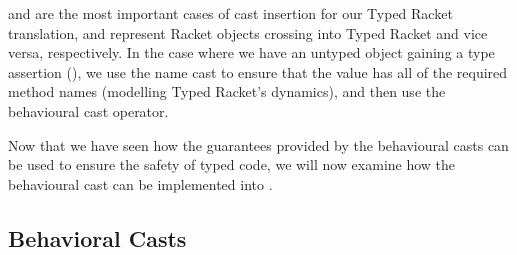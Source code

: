 \documentclass[a4paper,USenglish]{tex/lipics-v2016}
\begin{document}
\begin{mathpar}



\end{mathpar}

 and  are the most important cases of cast 
insertion for our Typed Racket translation, and represent Racket objects 
crossing into Typed Racket and vice versa, respectively. In the case where we 
have an untyped object gaining a type assertion (), we use the
name cast to ensure that the value has all of the required method names 
(modelling Typed Racket's dynamics), and then use the behavioural cast operator.


\begin{mathpar}

\end{mathpar}

Now that we have seen how the guarantees provided by the behavioural casts can 
be used to ensure the safety of typed code, we will now examine how the 
behavioural cast can be implemented into \kafka.


\subsection{Behavioral Casts}
\end{document}
